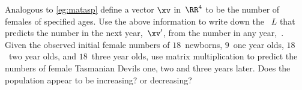 \begin{exercise}
Analogous to \autoref{eg:matasp} define a vector \(\xv\) in~\(\RR^4\) to be the number of females of specified ages.
Use the above information to write down the ~\(L\) that predicts the number in the next year,~\(\xv'\), from the number in any year,~\xv.
Given the observed initial female numbers of \(18\)~newborns, \(9\)~one year olds, \(18\)~two year olds, and \(18\)~three year olds, use matrix multiplication to predict the numbers of female Tasmanian Devils one, two and three years later.
Does the population appear to be increasing? or decreasing?
\end{exercise}

